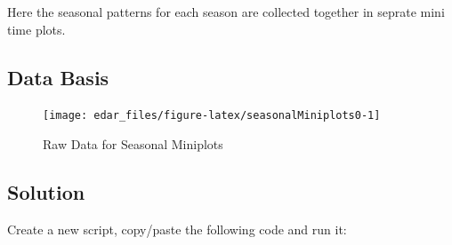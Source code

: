 \documentclass[
  a4paperpaper,
]{book}
\begin{document}
Here the seasonal patterns for each season are collected together in seprate mini time plots.

\hypertarget{data-basis-7}{%
\subsection{Data Basis}\label{data-basis-7}}

\begin{figure}
\texttt{[image: edar\_files/figure-latex/seasonalMiniplots0-1]} \caption{Raw Data for Seasonal Miniplots}\label{fig:seasonalMiniplots0}
\end{figure}

\newpage

\hypertarget{solution-7}{%
\subsection{Solution}\label{solution-7}}

Create a new script, copy/paste the following code and run it:
\end{document}
